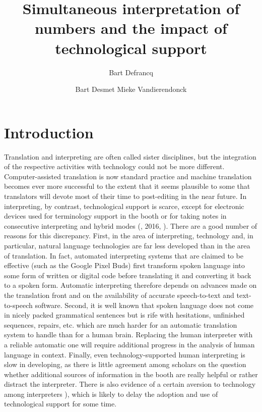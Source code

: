 \documentclass[output=paper]{langsci/langscibook}
\title{Simultaneous interpretation of numbers and the impact of technological support}
\author{%
 Bart Defrancq\affiliation{University of Eden}\and%
 Bart Desmet\affiliation{University of Eden}\lastand%
 Mieke Vandierendonck\affiliation{University of Eden}
}
\begin{document}

 

 
\section{Introduction}
Translation and interpreting are often called sister disciplines, but the integration of the respective activities with technology could not be more different. Computer-assisted translation is now standard practice and machine translation becomes ever more successful to the extent that it seems plausible to some that translators will devote most of their time to post-editing in the near future. In interpreting, by contrast, technological support is scarce, except for electronic devices used for terminology support in the booth \citep{Fantinuoli2012} or for taking notes in consecutive interpreting and hybrid modes (\citealt{Orlando2014}, 2016, \citealt{Goldsmith2017}). There are a good number of reasons for this discrepancy. First, in the area of interpreting, technology and, in particular, natural language technologies are far less developed than in the area of translation. In fact, automated interpreting systems that are claimed to be effective (such as the Google Pixel Buds) first transform spoken language into some form of written or digital code before translating it and converting it back to a spoken form. Automatic interpreting therefore depends on advances made on the translation front and on the availability of accurate speech-to-text and text-to-speech software. Second, it is well known that spoken language does not come in nicely packed grammatical sentences but is rife with hesitations, unfinished sequences, repairs, etc. which are much harder for an automatic translation system to handle than for a human brain. Replacing the human interpreter with a reliable automatic one will require additional progress in the analysis of human language in context. Finally, even technology-supported human interpreting is slow in developing, as there is little agreement among scholars on the question whether additional sources of information in the booth are really helpful or rather distract the interpreter. There is also evidence of a certain aversion to technology among interpreters \citep{CorpasPastor2016}), which is likely to delay the adoption and use of technological support for some time. 
\end{document}
